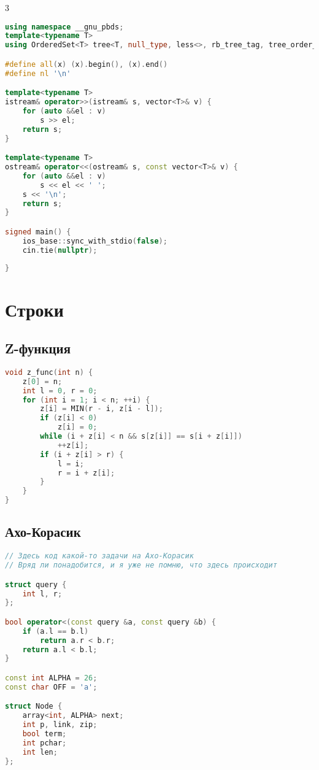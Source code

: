 \documentclass[10pt,a4paper,landscape,twosided]{extarticle}
\begin{document}
\begin{multicols}{3}
\begin{lstlisting}[language=C++]
using namespace __gnu_pbds;
template<typename T>
using OrderedSet<T> tree<T, null_type, less<>, rb_tree_tag, tree_order_statistics_node_update>;

#define all(x) (x).begin(), (x).end()
#define nl '\n'

template<typename T>
istream& operator>>(istream& s, vector<T>& v) {
    for (auto &&el : v)
        s >> el;
    return s;
}

template<typename T>
ostream& operator<<(ostream& s, const vector<T>& v) {
    for (auto &&el : v)
        s << el << ' ';
    s << '\n';
    return s;
}

signed main() {
    ios_base::sync_with_stdio(false);
    cin.tie(nullptr);
  
}
\end{lstlisting}

\section{Строки}

\subsection{Z-функция}
\begin{lstlisting}[language=C++]
void z_func(int n) {
    z[0] = n;
    int l = 0, r = 0;
    for (int i = 1; i < n; ++i) {
        z[i] = MIN(r - i, z[i - l]);
        if (z[i] < 0)
            z[i] = 0;
        while (i + z[i] < n && s[z[i]] == s[i + z[i]])
            ++z[i];
        if (i + z[i] > r) {
            l = i;
            r = i + z[i];
        }
    }
}
\end{lstlisting}

\subsection{Ахо-Корасик}
\begin{lstlisting}[language=C++]
// Здесь код какой-то задачи на Ахо-Корасик
// Вряд ли понадобится, и я уже не помню, что здесь происходит

struct query {
    int l, r;
};

bool operator<(const query &a, const query &b) {
    if (a.l == b.l)
        return a.r < b.r;
    return a.l < b.l;
}

const int ALPHA = 26;
const char OFF = 'a';

struct Node {
    array<int, ALPHA> next;
    int p, link, zip;
    bool term;
    int pchar;
    int len;
};


\end{lstlisting}
\end{multicols}
\end{document}
